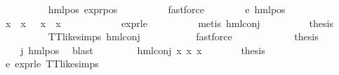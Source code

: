\begin{isabellebody}
\ \ \ \ \ \ \ \ \isamarkupfalse%
\ hml{\isacharunderscore}{\kern0pt}pos\ expr{\isacharunderscore}{\kern0pt}{}{\isacharunderscore}{\kern0pt}pos\isanewline
\ \ \ \ \ \ \ \ \isamarkupfalse%
\ fastforce\isanewline
\ \ \ \ \ \ \isamarkupfalse%
\ e{}{\isacharunderscore}{\kern0pt}{\isasympsi}\ hml{\isacharunderscore}{\kern0pt}pos\ \isamarkupfalse%
\ {\isachardoublequoteopen}x{}{}\ {\isacharbackquote}{\kern0pt}\ x{}{}\ {\isacharequal}{\kern0pt}\ {\isacharbraceleft}{\kern0pt}{\isacharbraceright}{\kern0pt}{\isachardoublequoteclose}\ {\isachardoublequoteopen}x{}{}\ {\isacharbackquote}{\kern0pt}\ x{}{}\ {\isacharequal}{\kern0pt}\ {\isacharbraceleft}{\kern0pt}{\isacharbraceright}{\kern0pt}{\isachardoublequoteclose}\isanewline
\ \ \ \ \ \ \ \ \isamarkupfalse%
\ expr{\isacharunderscore}{\kern0pt}{}{\isacharunderscore}{\kern0pt}le{\isacharunderscore}{\kern0pt}{}\isanewline
\ \ \ \ \ \ \ \ \isamarkupfalse%
\ {\isacharparenleft}{\kern0pt}metis\ hml{\isacharunderscore}{\kern0pt}conj{\isacharparenright}{\kern0pt}{\isacharplus}{\kern0pt}\isanewline
\ \ \ \ \ \ \isamarkupfalse%
\ \isamarkupfalse%
\ {\isacharquery}{\kern0pt}thesis\ \isanewline
\ \ \ \ \ \ \ \ \isamarkupfalse%
\ TT{\isacharunderscore}{\kern0pt}like{\isachardot}{\kern0pt}simps\ hml{\isacharunderscore}{\kern0pt}conj\ \isanewline
\ \ \ \ \ \ \ \ \isamarkupfalse%
\ fastforce\isanewline
\ \ \ \ \isamarkupfalse%
\isanewline
\ \ \ \ \isamarkupfalse%
\ \isamarkupfalse%
\ {\isacharquery}{\kern0pt}thesis\isanewline
\ \ \ \ \ \ \isamarkupfalse%
\ {\isacartoucheopen}{\isasympsi}\ {\isacharequal}{\kern0pt}\ {\isasymPhi}\ j{\isacartoucheclose}\ hml{\isacharunderscore}{\kern0pt}pos\ \isamarkupfalse%
\ blast\isanewline
\ \ \isamarkupfalse%
\isanewline
\ \ \ \ \isamarkupfalse%
\ {\isacharparenleft}{\kern0pt}hml{\isacharunderscore}{\kern0pt}conj\ x{}{}\ x{}{}\ x{}{}{\isacharparenright}{\kern0pt}\isanewline
\ \ \ \ \isamarkupfalse%
\ \isamarkupfalse%
\ {\isacharquery}{\kern0pt}thesis\ \isamarkupfalse%
\ e{}{\isacharunderscore}{\kern0pt}{\isasympsi}\ expr{\isacharunderscore}{\kern0pt}{}{\isacharunderscore}{\kern0pt}le{\isacharunderscore}{\kern0pt}{}\ TT{\isacharunderscore}{\kern0pt}like{\isachardot}{\kern0pt}simps\isanewline

\end{isabellebody}

